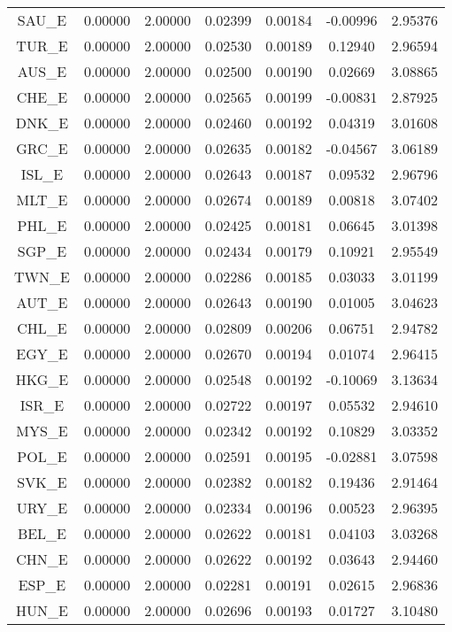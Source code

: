 \begin{longtable}{c c c c c c c}
SAU_E & 0.00000 & 2.00000 & 0.02399 & 0.00184 & -0.00996 & 2.95376 \\
TUR_E & 0.00000 & 2.00000 & 0.02530 & 0.00189 & 0.12940 & 2.96594 \\
AUS_E & 0.00000 & 2.00000 & 0.02500 & 0.00190 & 0.02669 & 3.08865 \\
CHE_E & 0.00000 & 2.00000 & 0.02565 & 0.00199 & -0.00831 & 2.87925 \\
DNK_E & 0.00000 & 2.00000 & 0.02460 & 0.00192 & 0.04319 & 3.01608 \\
GRC_E & 0.00000 & 2.00000 & 0.02635 & 0.00182 & -0.04567 & 3.06189 \\
ISL_E & 0.00000 & 2.00000 & 0.02643 & 0.00187 & 0.09532 & 2.96796 \\
MLT_E & 0.00000 & 2.00000 & 0.02674 & 0.00189 & 0.00818 & 3.07402 \\
PHL_E & 0.00000 & 2.00000 & 0.02425 & 0.00181 & 0.06645 & 3.01398 \\
SGP_E & 0.00000 & 2.00000 & 0.02434 & 0.00179 & 0.10921 & 2.95549 \\
TWN_E & 0.00000 & 2.00000 & 0.02286 & 0.00185 & 0.03033 & 3.01199 \\
AUT_E & 0.00000 & 2.00000 & 0.02643 & 0.00190 & 0.01005 & 3.04623 \\
CHL_E & 0.00000 & 2.00000 & 0.02809 & 0.00206 & 0.06751 & 2.94782 \\
EGY_E & 0.00000 & 2.00000 & 0.02670 & 0.00194 & 0.01074 & 2.96415 \\
HKG_E & 0.00000 & 2.00000 & 0.02548 & 0.00192 & -0.10069 & 3.13634 \\
ISR_E & 0.00000 & 2.00000 & 0.02722 & 0.00197 & 0.05532 & 2.94610 \\
MYS_E & 0.00000 & 2.00000 & 0.02342 & 0.00192 & 0.10829 & 3.03352 \\
POL_E & 0.00000 & 2.00000 & 0.02591 & 0.00195 & -0.02881 & 3.07598 \\
SVK_E & 0.00000 & 2.00000 & 0.02382 & 0.00182 & 0.19436 & 2.91464 \\
URY_E & 0.00000 & 2.00000 & 0.02334 & 0.00196 & 0.00523 & 2.96395 \\
BEL_E & 0.00000 & 2.00000 & 0.02622 & 0.00181 & 0.04103 & 3.03268 \\
CHN_E & 0.00000 & 2.00000 & 0.02622 & 0.00192 & 0.03643 & 2.94460 \\
ESP_E & 0.00000 & 2.00000 & 0.02281 & 0.00191 & 0.02615 & 2.96836 \\
HUN_E & 0.00000 & 2.00000 & 0.02696 & 0.00193 & 0.01727 & 3.10480 \\

\end{longtable}
